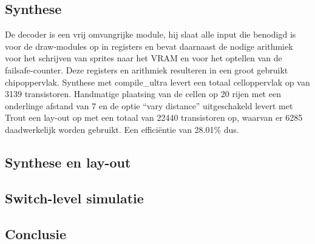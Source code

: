 \documentclass{scrartcl} %
\begin{document}
\subsection{Synthese}
De decoder is een vrij omvangrijke module, hij slaat alle input die benodigd is voor de draw-modules op in registers en bevat daarnaast de nodige arithmiek voor het schrijven van sprites naar het VRAM en voor het optellen van de failsafe-counter. Deze registers en arithmiek resulteren in een groot gebruikt chipoppervlak. Synthese met compile_ultra levert een totaal celloppervlak op van 3139 transistoren. Handmatige plaatsing van de cellen op 20 rijen met een onderlinge afstand van 7 en de optie ``vary distance'' uitgeschakeld levert met Trout een lay-out op met een totaal van 22440 transistoren op, waarvan er 6285 daadwerkelijk worden gebruikt. Een efficiëntie van 28.01\% dus.


\subsection{Synthese en lay-out}


\subsection{Switch-level simulatie}

\subsection{Conclusie}
\end{document}
